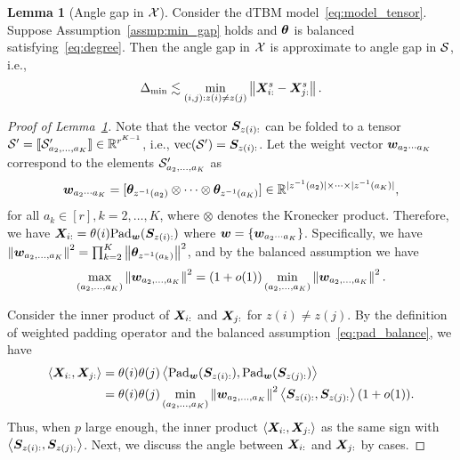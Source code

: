 \documentclass[lettersize,onecolumn,journal]{IEEEtran}
\theoremstyle{definition}
\newtheorem{lem}{Lemma}
\theoremstyle{definition}
\newcommand{\ang}[1]{\left\langle#1\right\rangle}
\begin{document}
\begin{lem}[Angle gap in $\mathcal{X}$]\label{lem:angle_gap_x} Consider the dTBM model~\eqref{eq:model_tensor}. Suppose Assumption~\ref{assmp:min_gap} holds and $\boldsymbol{\theta}$ is balanced satisfying~\eqref{eq:degree}. Then the angle gap in $\mathcal{X}$ is approximate to angle gap in $\mathcal{S}$, i.e.,
\begin{equation}
    \Delta_{\min} \lesssim  \min_{(i,j): z(i) \neq z(j)} \left\lVert\bm X_{i:}^s - \bm X_{j:}^s\right\rVert. 
\end{equation}
\end{lem}

\begin{proof}[Proof of Lemma~\ref{lem:angle_gap_x}] 
Note that the vector $\bm S_{z(i):}$ can be folded to a tensor $\mathcal{S}' =\llbracket \mathcal{S}'_{a_2,\ldots,a_K} \rrbracket \in \mathbb{R}^{r^{K-1}}$, i.e., $\text{vec}(\mathcal{S}') = \bm S_{z(i):}$. Let the weight vector $\bm{w}_{a_2 \cdots a_K}$ correspond to the elements $\mathcal{S}'_{a_2,\ldots,a_K}$ as
\begin{equation}
    \bm{w}_{a_2 \cdots a_K} = [ \boldsymbol{\theta}_{z^{-1} (a_2)} \otimes \cdots \otimes \boldsymbol{\theta}_{z^{-1} (a_K)}] \in \mathbb{R}^{|z^{-1} (a_2)| \times \cdots \times |z^{-1} (a_K)|},
\end{equation}
for all $a_k \in [r], k = 2,\ldots, K$, where $\otimes$ denotes the Kronecker product. Therefore, we have  $\bm X_{i:} = \theta(i) \text{Pad}_{\bm{w}}(\bm S_{z(i):})$ where $\bm{w} = \{ \bm{w}_{a_2 \cdots a_K}\}$. Specifically, we have $\left\lVert\bm{w}_{a_2,\ldots,a_K}\right\rVert^2 = \prod_{k = 2}^K \left\lVert \boldsymbol{\theta}_{z^{-1}(a_k)}\right\rVert^2$, and by the balanced assumption we have 
\begin{equation}\label{eq:pad_balance}
    \max_{(a_2,\ldots, a_K)} \onorm{\mw_{a_2,\ldots, a_K}}^2 = (1 + o(1))  \min_{(a_2,\ldots, a_K)} \onorm{\mw_{a_2,\ldots, a_K}}^2.
\end{equation}

Consider the inner product of $\bm X_{i:}$ and $\bm X_{j:}$ for $z(i) \neq z(j)$. By the definition of weighted padding operator and the balanced assumption~\eqref{eq:pad_balance}, we have 
\begin{align}
    \ang{\mX_{i:},\mX_{j:}} &= \theta(i) \theta(j) \ang{ \pad_{\mw}(\mS_{z(i):}), \pad_{\mw}(\mS_{z(j):} )}\\
    &= \theta(i) \theta(j) \min_{(a_2,\ldots, a_K)} \onorm{\mw_{a_2,\ldots, a_K}}^2 \ang{\mS_{z(i):}, \mS_{z(j):}}(1 + o(1)).
\end{align}
Thus, when $p$ large enough, the inner product $\ang{\mX_{i:},\mX_{j:}} $ as the same sign with $\ang{\mS_{z(i):}, \mS_{z(j):}}$. Next, we discuss the angle between $\bm X_{i:}$ and $\bm X_{j:}$ by cases.


\end{proof}
\end{document}
